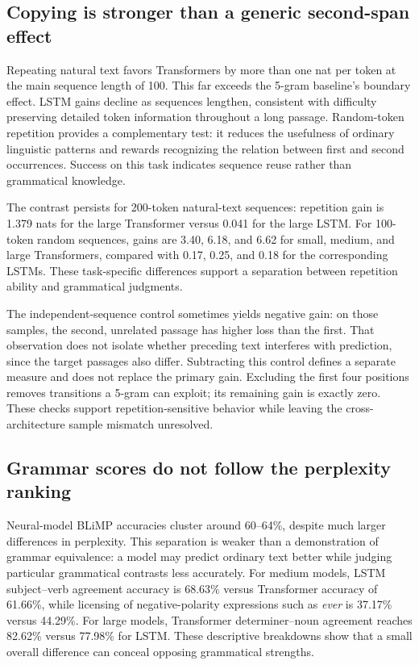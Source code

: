 \documentclass[10pt]{article}
\begin{document}
\subsection{Copying is stronger than a generic second-span effect}

Repeating natural text favors Transformers by more than one nat per token at the main sequence length of 100. This far exceeds the 5-gram baseline's boundary effect. LSTM gains decline as sequences lengthen, consistent with difficulty preserving detailed token information throughout a long passage. Random-token repetition provides a complementary test: it reduces the usefulness of ordinary linguistic patterns and rewards recognizing the relation between first and second occurrences. Success on this task indicates sequence reuse rather than grammatical knowledge.

The contrast persists for 200-token natural-text sequences: repetition gain is 1.379 nats for the large Transformer versus 0.041 for the large LSTM. For 100-token random sequences, gains are 3.40, 6.18, and 6.62 for small, medium, and large Transformers, compared with 0.17, 0.25, and 0.18 for the corresponding LSTMs. These task-specific differences support a separation between repetition ability and grammatical judgments.

The independent-sequence control sometimes yields negative gain: on those samples, the second, unrelated passage has higher loss than the first. That observation does not isolate whether preceding text interferes with prediction, since the target passages also differ. Subtracting this control defines a separate measure and does not replace the primary gain. Excluding the first four positions removes transitions a 5-gram can exploit; its remaining gain is exactly zero. These checks support repetition-sensitive behavior while leaving the cross-architecture sample mismatch unresolved.

\subsection{Grammar scores do not follow the perplexity ranking}

Neural-model BLiMP accuracies cluster around 60--64\%, despite much larger differences in perplexity. This separation is weaker than a demonstration of grammar equivalence: a model may predict ordinary text better while judging particular grammatical contrasts less accurately. For medium models, LSTM subject--verb agreement accuracy is 68.63\% versus Transformer accuracy of 61.66\%, while licensing of negative-polarity expressions such as \emph{ever} is 37.17\% versus 44.29\%. For large models, Transformer determiner--noun agreement reaches 82.62\% versus 77.98\% for LSTM. These descriptive breakdowns show that a small overall difference can conceal opposing grammatical strengths.
\end{document}
